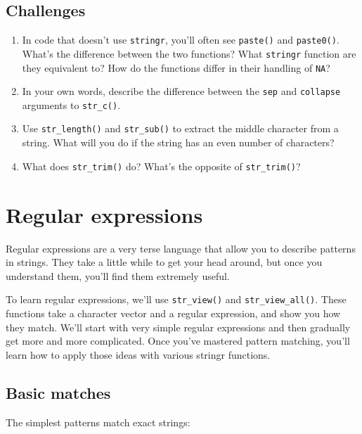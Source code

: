\documentclass[]{book}
\begin{document}
\subsection*{Challenges}\label{challenges-15}

\begin{enumerate}
\def\labelenumi{\arabic{enumi}.}
\item
  In code that doesn't use \texttt{stringr}, you'll often see
  \texttt{paste()} and \texttt{paste0()}. What's the difference between
  the two functions? What \texttt{stringr} function are they equivalent
  to? How do the functions differ in their handling of \texttt{NA}?
\item
  In your own words, describe the difference between the \texttt{sep}
  and \texttt{collapse} arguments to \texttt{str\_c()}.
\item
  Use \texttt{str\_length()} and \texttt{str\_sub()} to extract the
  middle character from a string. What will you do if the string has an
  even number of characters?
\item
  What does \texttt{str\_trim()} do? What's the opposite of
  \texttt{str\_trim()}?
\end{enumerate}

\hypertarget{regular-expressions}{\section{Regular
expressions}\label{regular-expressions}}

Regular expressions are a very terse language that allow you to describe
patterns in strings. They take a little while to get your head around,
but once you understand them, you'll find them extremely useful.

To learn regular expressions, we'll use \texttt{str\_view()} and
\texttt{str\_view\_all()}. These functions take a character vector and a
regular expression, and show you how they match. We'll start with very
simple regular expressions and then gradually get more and more
complicated. Once you've mastered pattern matching, you'll learn how to
apply those ideas with various stringr functions.

\subsection{Basic matches}\label{basic-matches}

The simplest patterns match exact strings:
\end{document}
